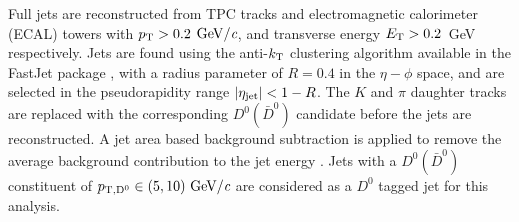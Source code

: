 \documentclass{appolb}
\begin{document}
Full jets are reconstructed from TPC tracks and electromagnetic calorimeter (ECAL) towers with $p_{\rm T} > 0.2$ $\rm GeV/\textit{c}$, and transverse energy \mbox{$E_{\rm T} > 0.2$ GeV} respectively. Jets are found using the anti-$k_{\rm T}$ clustering algorithm available in the FastJet package \cite{FASTJET}, with a radius parameter of $R = 0.4$ in the $\eta-\phi$ space, and are selected in the pseudorapidity range $|\eta_{\rm jet}| < 1 - R$. The $K$ and $\pi$ daughter tracks are replaced with the corresponding $D^{0} (\bar{D}^{0})$ candidate before the jets are reconstructed. A jet area based background subtraction is applied to remove the average background contribution to the jet energy \cite{JetAreaBackground}. Jets with a $D^{0} (\bar{D}^{0})$ constituent of $p_{\rm T, D^{0}} \in (5, 10) \text{ GeV}/\textit{c}$ are considered as a $D^{0}$ tagged jet for this analysis.
\end{document}
